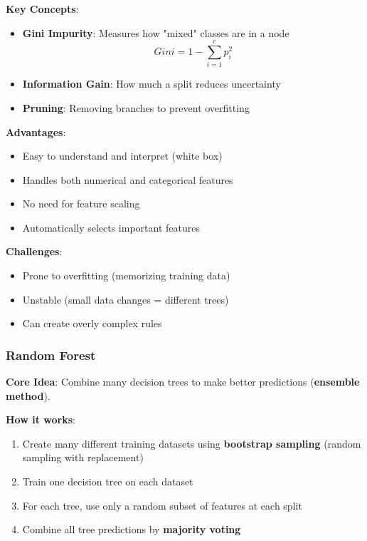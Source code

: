 \textbf{Key Concepts}:
\begin{itemize}
    \item \textbf{Gini Impurity}: Measures how "mixed" classes are in a node
    \begin{equation}
    Gini = 1 - \sum_{i=1}^{c} p_i^2
    \end{equation}
    \item \textbf{Information Gain}: How much a split reduces uncertainty
    \item \textbf{Pruning}: Removing branches to prevent overfitting
\end{itemize}

\textbf{Advantages}:
\begin{itemize}
    \item Easy to understand and interpret (white box)
    \item Handles both numerical and categorical features
    \item No need for feature scaling
    \item Automatically selects important features
\end{itemize}

\textbf{Challenges}:
\begin{itemize}
    \item Prone to overfitting (memorizing training data)
    \item Unstable (small data changes = different trees)
    \item Can create overly complex rules
\end{itemize}

\subsubsection{Random Forest}
\textbf{Core Idea}: Combine many decision trees to make better predictions (\textbf{ensemble method}).

\textbf{How it works}:
\begin{enumerate}
    \item Create many different training datasets using \textbf{bootstrap sampling} (random sampling with replacement)
    \item Train one decision tree on each dataset
    \item For each tree, use only a random subset of features at each split
    \item Combine all tree predictions by \textbf{majority voting}
\end{enumerate}



